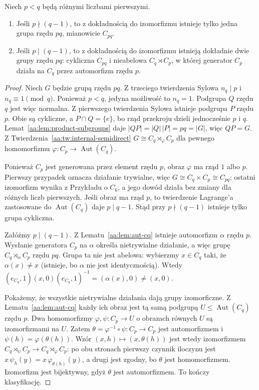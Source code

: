 \begin{twierdzenie}
\label{aa:tw:classify-pq}
Niech $p<q$ będą różnymi liczbami pierwszymi.
\begin{enumerate}
\item Jeśli $p\nmid(q-1)$, to z dokładnością do izomorfizmu
istnieje tylko jedna grupa rzędu $pq$, mianowicie $C_{pq}$.
\item Jeśli $p\mid(q-1)$, to z dokładnością do izomorfizmu
istnieją dokładnie dwie grupy rzędu $pq$:
cykliczna $C_{pq}$ i nieabelowa $C_q\rtimes C_p$,
w której generator $C_p$ działa na $C_q$
przez automorfizm rzędu $p$.
\end{enumerate}
\end{twierdzenie}
\begin{proof}
Niech $G$ będzie grupą rzędu $pq$.
Z trzeciego twierdzenia Sylowa $n_q\mid p$ i
$n_q\equiv1\pmod q$. Ponieważ $p<q$, jedyna możliwość
to $n_q=1$. Podgrupa $Q$ rzędu $q$ jest więc normalna.
Z pierwszego twierdzenia Sylowa istnieje podgrupa $P$ rzędu $p$.
Obie są cykliczne, a $P\cap Q=\{e\}$, bo rząd przekroju
dzieli jednocześnie $p$ i $q$.
Lemat~\ref{aa:lem:product-subgroups} daje
$|QP|=|Q|\,|P|=pq=|G|$, więc $QP=G$.
Z Twierdzenia~\ref{aa:tw:internal-semidirect}
$G\cong C_q\rtimes_\varphi C_p$ dla pewnego homomorfizmu
$\varphi:C_p\to\operatorname{Aut}(C_q)$.

Ponieważ $C_p$ jest generowana przez element rzędu $p$,
obraz $\varphi$ ma rząd $1$ albo $p$.
Pierwszy przypadek oznacza działanie trywialne,
więc $G\cong C_q\times C_p\cong C_{pq}$;
ostatni izomorfizm wynika z Przykładu o $C_6$,
a jego dowód działa bez zmiany dla różnych liczb pierwszych.
Jeśli obraz ma rząd $p$, to twierdzenie Lagrange'a zastosowane
do $\operatorname{Aut}(C_q)$ daje $p\mid q-1$.
Stąd przy $p\nmid(q-1)$ istnieje tylko grupa cykliczna.

Załóżmy $p\mid(q-1)$. Z Lematu~\ref{aa:lem:aut-cq}
istnieje automorfizm $\alpha$ rzędu $p$.
Wysłanie generatora $C_p$ na $\alpha$ określa nietrywialne
działanie, a więc grupę $C_q\rtimes_\alpha C_p$ rzędu $pq$.
Grupa ta nie jest abelowa: wybierzmy $x\in C_q$ taki,
że $\alpha(x)\ne x$ (istnieje, bo $\alpha$ nie jest identycznością).
Wtedy $(e_{C_q},1)(x,0)(e_{C_q},1)^{-1}=(\alpha(x),0)\ne(x,0)$.

Pokażemy, że wszystkie nietrywialne działania dają grupy
izomorficzne. Z Lematu~\ref{aa:lem:aut-cq} każdy ich obraz
jest tą samą podgrupą $U\le\operatorname{Aut}(C_q)$ rzędu $p$.
Dwa homomorfizmy $\varphi,\psi:C_p\to U$ o obrazach równych $U$
są izomorfizmami na $U$.
Zatem $\theta=\varphi^{-1}\circ\psi:C_p\to C_p$ jest
automorfizmem i $\psi(h)=\varphi(\theta(h))$.
Wzór $(x,h)\mapsto(x,\theta(h))$ jest wtedy izomorfizmem
$C_q\rtimes_\psi C_p\to C_q\rtimes_\varphi C_p$:
po obu stronach pierwszy czynnik iloczynu jest
$x\,\psi_h(y)=x\,\varphi_{\theta(h)}(y)$,
a drugi jest zgodny, bo $\theta$ jest homomorfizmem.
Izomorfizm jest bijektywny, gdyż $\theta$ jest automorfizmem.
To kończy klasyfikację.
\end{proof}

